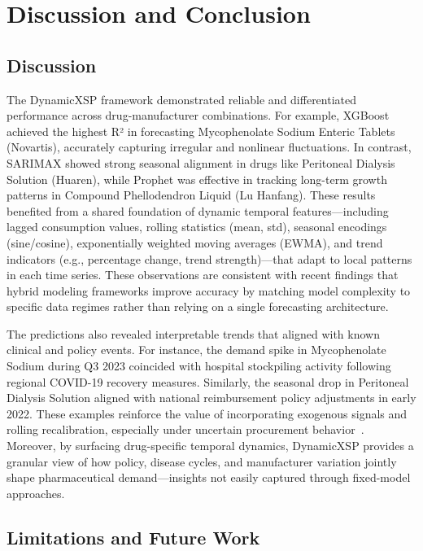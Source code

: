 \documentclass[12pt]{article}
\begin{document}
\section{Discussion and Conclusion}

\subsection{Discussion}

The DynamicXSP framework demonstrated reliable and differentiated performance across drug-manufacturer combinations. For example, XGBoost achieved the highest R² in forecasting Mycophenolate Sodium Enteric Tablets (Novartis), accurately capturing irregular and nonlinear fluctuations. In contrast, SARIMAX showed strong seasonal alignment in drugs like Peritoneal Dialysis Solution (Huaren), while Prophet was effective in tracking long-term growth patterns in Compound Phellodendron Liquid (Lu Hanfang). These results benefited from a shared foundation of dynamic temporal features—including lagged consumption values, rolling statistics (mean, std), seasonal encodings (sine/cosine), exponentially weighted moving averages (EWMA), and trend indicators (e.g., percentage change, trend strength)—that adapt to local patterns in each time series. These observations are consistent with recent findings that hybrid modeling frameworks improve accuracy by matching model complexity to specific data regimes rather than relying on a single forecasting architecture. ~\cite{bandara2020}~\cite{petropoulos2020}

The predictions also revealed interpretable trends that aligned with known clinical and policy events. For instance, the demand spike in Mycophenolate Sodium during Q3 2023 coincided with hospital stockpiling activity following regional COVID-19 recovery measures. Similarly, the seasonal drop in Peritoneal Dialysis Solution aligned with national reimbursement policy adjustments in early 2022. These examples reinforce the value of incorporating exogenous signals and rolling recalibration, especially under uncertain procurement behavior~\cite{kwon2023}. Moreover, by surfacing drug-specific temporal dynamics, DynamicXSP provides a granular view of how policy, disease cycles, and manufacturer variation jointly shape pharmaceutical demand—insights not easily captured through fixed-model approaches.

\subsection{Limitations and Future Work}
\end{document}
